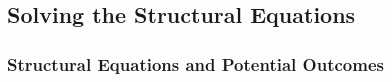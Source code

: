 
\subsection{Solving the Structural Equations}

\subsubsection{Structural Equations and Potential Outcomes}

